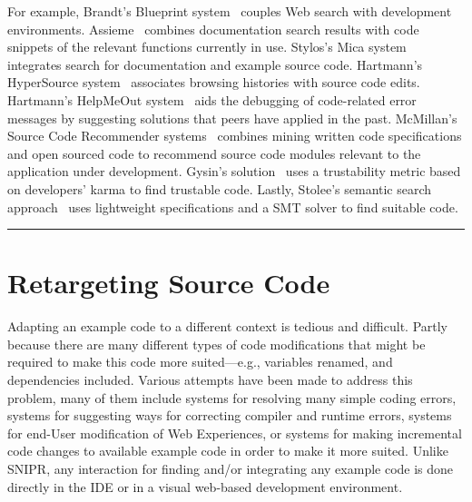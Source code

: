 For example, Brandt’s Blueprint system~\cite{Brandt:2010tp} couples Web search with development environments. Assieme~\cite{Hoffmann:2007wo} combines documentation search results with code snippets of the relevant functions currently in use. Stylos's Mica system~\cite{Stylos:2006gu} integrates search for documentation and example source code. Hartmann's HyperSource system~\cite{Hartmann:2011ii} associates browsing histories with source code edits. Hartmann's HelpMeOut system~\cite{Hartmann:2010hx} aids the debugging of code-related error messages by suggesting solutions that peers have applied in the past. McMillan's Source Code Recommender systems~\cite{McMillan:2012dj} combines mining written code specifications and open sourced code to recommend source code modules relevant to the application under development. Gysin's solution~\cite{Gysin:2010kt} uses a trustability metric based on developers' karma to find trustable code. Lastly, Stolee's semantic search approach~\cite{Stolee:2012wp} uses lightweight specifications and a SMT solver to find suitable code.

\fancybreak{\pfbreakdisplay}

\section{Retargeting Source Code}
\label{sec:retargetingcode}

Adapting an example code to a different context is tedious and difficult. Partly because there are many different types of code modifications that might be required to make this code more suited---e.g., variables renamed, and dependencies included. Various attempts have been made to address this problem, many of them include systems for resolving many simple coding errors, systems for suggesting ways for correcting compiler and runtime errors, systems for end-User modification of Web Experiences, or systems for making incremental code changes to available example code in order to make it more suited. Unlike \uppercase{SnipR}, any interaction for finding and/or integrating any example code is done directly in the IDE or in a visual web-based development environment.  

